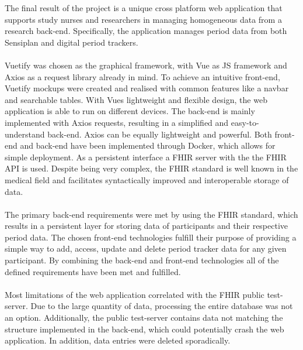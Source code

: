 \documentclass[
a4paper,
11pt
]{article}
\begin{document}
	
	The final result of the project is a unique cross platform web application that supports study nurses and researchers in managing homogeneous data from a research back-end. Specifically, the application manages period data from both Sensiplan\textsuperscript{\textcopyright} and digital period trackers.
	\\
	\\%
	Vuetify was chosen as the graphical framework, with \ac{Vue} as \ac{JS} framework and Axios as a request library already in mind. To achieve an intuitive front-end, Vuetify mockups were created and realised with common features like a navbar and searchable tables. With \acp{Vue} lightweight and flexible design, the web application is able to run on different devices. The back-end is mainly implemented with Axios requests, resulting in a simplified and easy-to-understand back-end. Axios can be equally lightweight and powerful. Both front-end and back-end have been implemented through Docker, which allows for simple deployment. As a persistent interface a \ac{FHIR} server with the the \ac{FHIR} \ac{API} is used. Despite being very complex, the \ac{FHIR} standard is well known in the medical field and facilitates syntactically improved and interoperable storage of data.
	\\
	\\%
	The primary back-end requirements were met by using the \ac{FHIR} standard, which results in a persistent layer for storing data of participants and their respective period data. The chosen front-end technologies fulfill their purpose of providing a simple way to add, access, update and delete period tracker data for any given participant. By combining the back-end and front-end technologies all of the defined requirements have been met and fulfilled.
	\\
	\\%
	Most limitations of the web application correlated with the \ac{FHIR} public test-server. Due to the large quantity of data, processing the entire database was not an option. Additionally, the public test-server contains data not matching the structure implemented in the back-end, which could potentially crash the web application. In addition, data entries were deleted sporadically.
	\\
	\\
\end{document}
